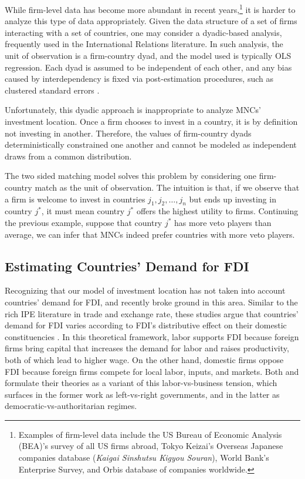 While firm-level data has become more abundant in recent years,\footnote{Examples of firm-level data include the US Bureau of Economic Analysis (BEA)'s survey of all US firms abroad, Tokyo Keizai's Overseas Japanese companies database (\textit{Kaigai Sinshutsu Kigyou Souran}), World Bank's Enterprise Survey, and Orbis database of companies worldwide.} it is harder to analyze this type of data appropriately. Given the data structure of a set of firms interacting with a set of countries, one may consider a dyadic-based analysis, frequently used in the International Relations literature. In such analysis, the unit of observation is a firm-country dyad, and the model used is typically OLS regression. Each dyad is assumed to be independent of each other, and any bias caused by interdependency is fixed via post-estimation procedures, such as clustered standard errors \citep{Dorff2013}. 

Unfortunately, this dyadic approach is inappropriate to analyze MNCs' investment location. Once a firm chooses to invest in a country, it is by definition not investing in another. Therefore, the values of firm-country dyads deterministically constrained one another and cannot be modeled as independent draws from a common distribution.

The two sided matching model solves this problem by considering one firm-country match as the unit of observation. The intuition is that, if we observe that a firm is welcome to invest in countries $j_1, j_2, \dots, j_n$ but ends up investing in country $j^*$, it must mean country $j^*$ offers the highest utility to firms. Continuing the previous example, suppose that country $j^*$ has more veto players than average, we can infer that MNCs indeed prefer countries with more veto players.

\subsection{Estimating Countries' Demand for FDI}

Recognizing that our model of investment location has not taken into account countries' demand for FDI, \citet{Pinto2013} and \citet{Pandya2016} recently broke ground in this area. Similar to the rich IPE literature in trade and exchange rate, these studies argue that countries' demand for FDI varies according to FDI's distributive effect on their domestic constituencies \citep{Broz2001, Milner2005a}. In this theoretical framework, labor supports FDI because foreign firms bring capital that increases the demand for labor and raises productivity, both of which lead to higher wage. On the other hand, domestic firms oppose FDI because foreign firms compete for local labor, inputs, and markets. Both \citet{Pinto2013} and \citet{Pandya2016} formulate their theories as a variant of this labor-vs-business tension, which surfaces in the former work as left-vs-right governments, and in the latter as democratic-vs-authoritarian regimes.

